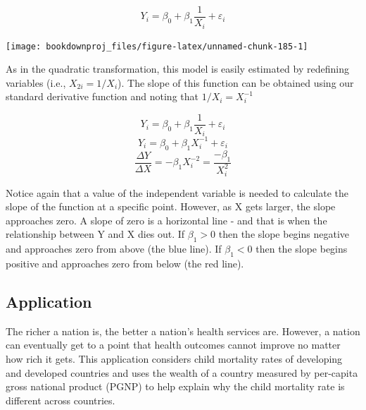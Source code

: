 \documentclass[
]{book}
\newenvironment{Shaded}{\begin{snugshade}}{\end{snugshade}}
\newcommand{\DecValTok}[1]{\textcolor[rgb]{0.00,0.00,0.81}{#1}}
\newcommand{\FunctionTok}[1]{\textcolor[rgb]{0.00,0.00,0.00}{#1}}
\newcommand{\NormalTok}[1]{#1}
\newcommand{\OtherTok}[1]{\textcolor[rgb]{0.56,0.35,0.01}{#1}}
\newcommand{\SpecialCharTok}[1]{\textcolor[rgb]{0.00,0.00,0.00}{#1}}
\newcommand{\StringTok}[1]{\textcolor[rgb]{0.31,0.60,0.02}{#1}}
\begin{document}
\[Y_i = \beta_0 + \beta_1 \frac{1}{X_i} + \varepsilon_i\]

\begin{center}\texttt{[image: bookdownproj\_files/figure-latex/unnamed-chunk-185-1]} \end{center}

As in the quadratic transformation, this model is easily estimated by redefining variables (i.e., \(X_{2i}=1/X_i\)). The slope of this function can be obtained using our standard derivative function and noting that \(1/X_i = X_i^{-1}\)

\[Y_i = \beta_0 + \beta_1 \frac{1}{X_i} + \varepsilon_i\]
\[Y_i = \beta_0 + \beta_1 X_i^{-1} + \varepsilon_i\]
\[\frac{\Delta Y}{\Delta X} = -\beta_1 X_i^{-2}=\frac{-\beta_1} {X_i^{2}}\]

Notice again that a value of the independent variable is needed to calculate the slope of the function at a specific point. However, as X gets larger, the slope approaches zero. A slope of zero is a horizontal line - and that is when the relationship between Y and X dies out. If \(\beta_1>0\) then the slope begins negative and approaches zero from above (the blue line). If \(\beta_1<0\) then the slope begins positive and approaches zero from below (the red line).

\hypertarget{application-6}{%
\subsection*{Application}\label{application-6}}

The richer a nation is, the better a nation's health services are. However, a nation can eventually get to a point that health outcomes cannot improve no matter how rich it gets. This application considers child mortality rates of developing and developed countries and uses the wealth of a country measured by per-capita gross national product (PGNP) to help explain why the child mortality rate is different across countries.

\begin{Shaded}
\end{Shaded}
\end{document}
